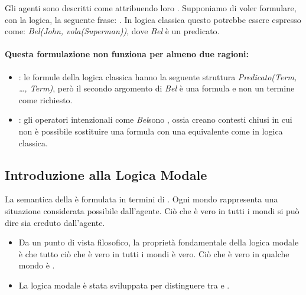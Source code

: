Gli agenti sono descritti come  attribuendo loro . Supponiamo di voler formulare, con la logica, la seguente frase: . In logica classica questo potrebbe essere espresso come: \textit{Bel(John, vola(Superman))}, dove \textit{Bel} è un predicato. 

\paragraph{Questa formulazione non funziona per almeno due ragioni:}

\begin{itemize}
  \item {}: le formule della logica classica hanno la seguente struttura \textit{Predicato(Term, \dots, Term)}, però il secondo argomento di \textit{Bel} è una formula e non un termine come richiesto. 
\item {}: gli operatori intenzionali come \textit{Bel}sono , ossia creano contesti chiusi in cui non è possibile sostituire una formula con una equivalente come in logica classica.
\end{itemize}

\subsection{Introduzione alla Logica Modale}

La semantica della  è formulata in termini di . Ogni mondo rappresenta una situazione considerata possibile dall'agente. Ciò che è vero in tutti i mondi si può dire sia creduto dall'agente.

\begin{itemize}
  \item Da un punto di vista filosofico, la proprietà fondamentale della logica modale è che tutto ciò che è vero in tutti i mondi è  vero. Ciò che è vero in qualche mondo è .
  \item La logica modale è stata sviluppata per distinguere tra  e .
\end{itemize}


